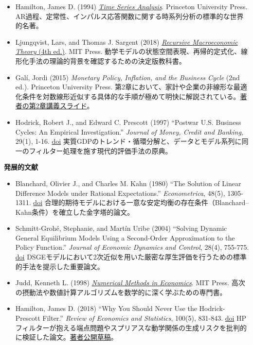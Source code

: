 \documentclass[
  japanese,
  lualatex,
  ja=standard,
  12pt,
  a4paper]{ltjsarticle}
\providecommand{\tightlist}{%
  \setlength{\itemsep}{0pt}\setlength{\parskip}{0pt}}
\begin{document}
\begin{itemize}
\tightlist
\item
  Hamilton, James D. (1994)
  \href{https://www.jstor.org/stable/j.ctv14jx6sm}{\emph{Time Series
  Analysis}}. Princeton University Press.
  AR過程、定常性、インパルス応答関数に関する時系列分析の標準的な世界的名著。
\item
  Ljungqvist, Lars, and Thomas J. Sargent (2018)
  \href{https://mitpress.mit.edu/9780262038669/recursive-macroeconomic-theory/}{\emph{Recursive
  Macroeconomic Theory} (4th ed.)}. MIT Press.
  動学モデルの状態空間表現、再帰的定式化、線形化手法の理論的背景を確認するための決定版教科書。
\item
  Galí, Jordi (2015) \emph{Monetary Policy, Inflation, and the Business
  Cycle} (2nd ed.). Princeton University Press.
  第2章において、家計や企業の非線形な最適化条件を対数線形近似する具体的な手順が極めて明快に解説されている。\href{https://crei.cat/wp-content/uploads/users/pages/ch2_slides_october_2015.pdf}{著者の第2章講義スライド}。
\item
  Hodrick, Robert J., and Edward C. Prescott (1997) ``Postwar U.S.
  Business Cycles: An Empirical Investigation.'' \emph{Journal of Money,
  Credit and Banking}, 29(1), 1-16.
  \href{https://doi.org/10.2307/2953682}{doi}
  実質GDPのトレンド・循環分解と、データとモデル系列に同一のフィルター処理を施す現代的評価手法の原典。
\end{itemize}


\textbf{発展的文献}

\begin{itemize}
\tightlist
\item
  Blanchard, Olivier J., and Charles M. Kahn (1980) ``The Solution of
  Linear Difference Models under Rational Expectations.''
  \emph{Econometrica}, 48(5), 1305-1311.
  \href{https://doi.org/10.2307/1912186}{doi}
  合理的期待モデルにおける一意な安定均衡の存在条件（Blanchard--Kahn条件）を確立した金字塔的論文。
\item
  Schmitt-Grohé, Stephanie, and Martín Uribe (2004) ``Solving Dynamic
  General Equilibrium Models Using a Second-Order Approximation to the
  Policy Function.'' \emph{Journal of Economic Dynamics and Control},
  28(4), 755-775.
  \href{https://doi.org/10.1016/S0165-1889(03)00043-5}{doi}
  DSGEモデルにおいて2次近似を用いた厳密な厚生評価を行うための標準的手法を提示した重要論文。
\item
  Judd, Kenneth L. (1998)
  \href{https://mitpress.mit.edu/9780262547741/numerical-methods-in-economics/}{\emph{Numerical
  Methods in Economics}}. MIT Press.
  高次の摂動法や数値計算アルゴリズムを数学的に深く学ぶための専門書。
\item
  Hamilton, James D. (2018) ``Why You Should Never Use the
  Hodrick-Prescott Filter.'' \emph{Review of Economics and Statistics},
  100(5), 831-843. \href{https://doi.org/10.1162/rest_a_00706}{doi}
  HPフィルターが抱える端点問題やスプリアスな動学関係の生成リスクを批判的に検証した論文。\href{https://econweb.ucsd.edu/~jhamilto/hp.pdf}{著者公開草稿}。
\end{itemize}
\end{document}

